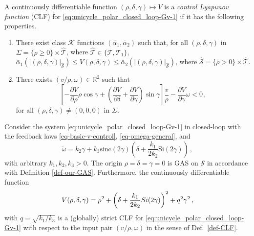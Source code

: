 \documentclass[10pt,a4paper]{amsart}
\begin{document}
\begin{definition}
\label{def-CLF}
A continuously differentiable function $(\rho,\delta,\gamma)\mapsto V$ 
is a \textit{control Lyapunov function} (CLF) for \eqref{eq:unicycle_polar_closed_loop-Gv-1} if it has the following properties.
\begin{enumerate}
\item There exist class $\mathcal{K}$ functions  $(\bar\alpha_1,\bar\alpha_2)$ such that,  for all $(\rho,\delta,\gamma)$ in 
$\Sigma = \{\rho\geq 0\}\times \hat{\mathcal{T}}$, where $\hat{\mathcal{T}}\in\{\mathcal{T},\mathcal{T}_1\}$, 
$ \bar\alpha_1(|(\rho,\delta, \gamma)|_{\hat{\mathcal{S}}}) \le V(\rho,\delta,\gamma) \le \bar\alpha_2(|(\rho,\delta, \gamma)|_{\hat{\mathcal{S}}})$, where $\hat{\mathcal{S}} = \{\rho> 0\}\times \hat{\mathcal{T}}$. \label{it:clf_prop_1}
\item There exists $(v/\rho,\omega)\in \mathbb{R}^2$ such that
\begin{equation*}
\left[-\dfrac{\partial V}{\partial\rho}\rho\cos\gamma + \left(\dfrac{\partial V}{\partial\delta}+\dfrac{\partial V}{\partial\gamma}\right)\sin\gamma \right]\dfrac{v}{\rho} - \dfrac{\partial V}{\partial\gamma}\omega < 0 \,,
\end{equation*}
for all $(\rho,\delta,\gamma)\neq (0,0,0)$ in $\Sigma$. \label{it:clf_prop_2}
\end{enumerate}
\end{definition}

\begin{theorem}
\label{thm:CLF_GloFo}
Consider the system \eqref{eq:unicycle_polar_closed_loop-Gv-1} in closed-loop with the feedback laws \eqref{eq-basic-v-control}, \eqref{eq-omega-general}, and
\begin{equation}
\label{eq:GloFo}
\tilde\omega = k_2\gamma + k_3\mbox{sinc}(2\gamma)
\left(\delta + \dfrac{k_1}{2k_2}\mbox{Si}(2\gamma) \right) \,,
\end{equation}
 with arbitrary $k_1, k_2, k_3 > 0$.
The origin $\rho = \delta = \gamma = 0$ is GAS on $\mathcal{S}$ in accordance with Definition \ref{def-our-GAS}.
Furthermore, the
continuously differentiable function 
\begin{equation}
V(\rho,\delta, \gamma)  = 
\rho^2+\left(\delta + \frac{k_1}{2k_2} {\rm Si}(2\gamma) \right)^2 + q^2 \gamma^2
\,,  \label{eq:V_CLF_GloFo_gamma_delta}
\end{equation}
with $q = \sqrt{k_1/k_3}$ is a (globally) strict CLF for \eqref{eq:unicycle_polar_closed_loop-Gv-1} with respect to the input pair $(v/\rho,\omega)$ in the sense of Def.~\ref{def-CLF}. 
\end{theorem}
\end{document}
